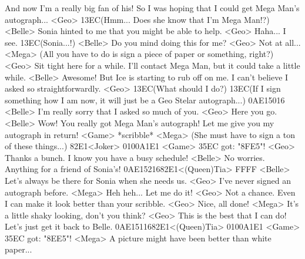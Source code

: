 And now I'm a really big fan of his! 
So I was hoping that I could get Mega Man's autograph... 
<Geo> {13}{EC}(Hmm...  Does she know  that I'm Mega Man!?) 
<Belle> Sonia hinted to me that you might be able to help. 
<Geo> Haha... I see. {13}{EC}(Sonia...!) 
<Belle> Do you mind doing this for me? 
<Geo> Not at all... 
<Mega> (All you have to do is  sign a piece of paper  or something, right?) 
<Geo> Sit tight here for a while. I'll contact Mega Man, but it could take a little while. 
<Belle> Awesome! 
But Ice is starting to rub off on me. I can't believe I asked so straightforwardly. 
<Geo> {13}{EC}(What should I do?) 
{13}{EC}(If I sign something how I  am now, it will just be a  Geo Stelar autograph...) 
{0A}{E1}{50}{16}
<Belle> I'm really sorry that I asked so much of you. 
<Geo> Here you go. 
<Belle> Wow! 
You really got Mega Man's autograph! 
Let me give you my autograph in return! 
<Game> *scribble* 
<Mega> (She must have to sign  a ton of these things...) 
{82}{E1}<Joker> {01}{00}{A1}{E1} 
<Game> {35}{EC} got: "{8F}{E5}"! 
<Geo> Thanks a bunch. I know you have a busy schedule! 
<Belle> No worries. Anything for a friend of Sonia's! 
{0A}{E1}{52}{16}{82}{E1}<(Queen)Tia> {FF}{FF}
<Belle> Let's always be there for Sonia when she needs us. 
<Geo> I've never signed an autograph before. 
<Mega> Heh heh... Let me do it! 
<Geo> Not a chance. 
Even I can make it look better than your scribble. 
<Geo> Nice, all done! 
<Mega> It's a little shaky looking, don't you think? 
<Geo> This is the best that I can do! Let's just get it back to Belle. 
{0A}{E1}{51}{16}{82}{E1}<(Queen)Tia> {01}{00}{A1}{E1} 
<Game> {35}{EC} got: "{8E}{E5}"! 
<Mega> A picture might have been better than white paper... 
